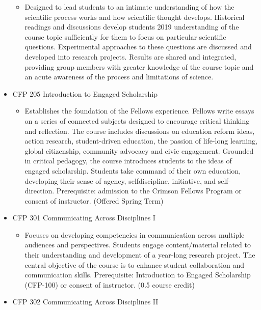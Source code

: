\documentclass[
  letterpaper,
]{scrbook}
\providecommand{\tightlist}{%
  \setlength{\itemsep}{0pt}\setlength{\parskip}{0pt}}
\begin{document}
\begin{itemize}
  \begin{itemize}
  \tightlist
  \item
    Designed to lead students to an intimate understanding of how the
    scientific process works and how scientific thought develops.
    Historical readings and discussions develop students 2019
    understanding of the course topic sufficiently for them to focus on
    particular scientific questions. Experimental approaches to these
    questions are discussed and developed into research projects.
    Results are shared and integrated, providing group members with
    greater knowledge of the course topic and an acute awareness of the
    process and limitations of science.
  \end{itemize}
\item
  CFP 205 Introduction to Engaged Scholarship

  \begin{itemize}
  \tightlist
  \item
    Establishes the foundation of the Fellows experience. Fellows write
    essays on a series of connected subjects designed to encourage
    critical thinking and reflection. The course includes discussions on
    education reform ideas, action research, student-driven education,
    the passion of life-long learning, global citizenship, community
    advocacy and civic engagement. Grounded in critical pedagogy, the
    course introduces students to the ideas of engaged scholarship.
    Students take command of their own education, developing their sense
    of agency, selfdiscipline, initiative, and self-direction.
    Prerequisite: admission to the Crimson Fellows Program or consent of
    instructor. (Offered Spring Term)
  \end{itemize}
\item
  CFP 301 Communicating Across Disciplines I

  \begin{itemize}
  \tightlist
  \item
    Focuses on developing competencies in communication across multiple
    audiences and perspectives. Students engage content/material related
    to their understanding and development of a year-long research
    project. The central objective of the course is to enhance student
    collaboration and communication skills. Prerequisite: Introduction
    to Engaged Scholarship (CFP-100) or consent of instructor. (0.5
    course credit)
  \end{itemize}
\item
  CFP 302 Communicating Across Disciplines II


\end{itemize}
\end{document}

